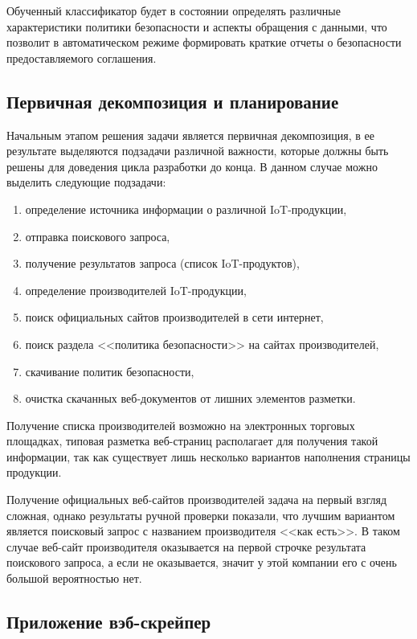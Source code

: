 \documentclass[../main]{subfiles}
\begin{document}
Обученный классификатор будет в состоянии определять различные характеристики политики безопасности и аспекты обращения с данными, что позволит в автоматическом режиме формировать краткие отчеты о безопасности предоставляемого соглашения.

\subsection{Первичная декомпозиция и планирование}
Начальным этапом решения задачи является первичная декомпозиция, в ее результате выделяются подзадачи различной важности, которые должны быть решены для доведения цикла разработки до конца. В данном случае можно выделить следующие подзадачи:
\begin{enumerate}
    \item определение источника информации о различной IoT-продукции,
    \item отправка поискового запроса,
    \item получение результатов запроса (список IoT-продуктов),
    \item определение производителей IoT-продукции,
    \item поиск официальных сайтов производителей в сети интернет,
    \item поиск раздела <<политика безопасности>> на сайтах производителей,
    \item скачивание политик безопасности,
    \item очистка скачанных веб-документов от лишних элементов разметки.
\end{enumerate}

Получение списка производителей возможно на электронных торговых площадках, типовая разметка веб-страниц располагает для получения такой информации, так как существует лишь несколько вариантов наполнения страницы продукции.

Получение официальных веб-сайтов производителей задача на первый взгляд сложная, однако результаты ручной проверки показали, что лучшим вариантом является поисковый запрос с названием производителя <<как есть>>. В таком случае веб-сайт производителя оказывается на первой строчке результата поискового запроса, а если не оказывается, значит у этой компании его с очень большой вероятностью нет.

\subsection{Приложение вэб-скрейпер}
\end{document}
